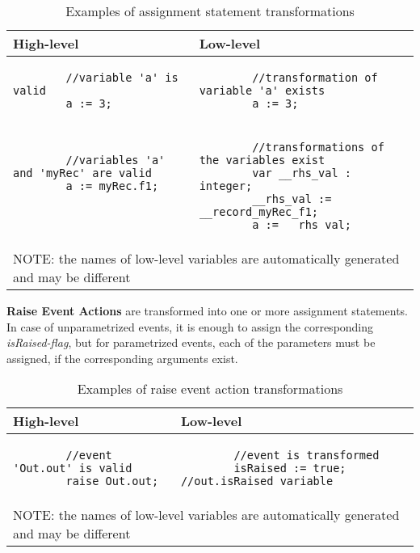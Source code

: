 \begin{table}[ht]
	\footnotesize
	\centering
	\begin{tabular}{ p{7cm} p{7cm} }
		\toprule
		High-level & Low-level \\
		\midrule
		\begin{lstlisting}
		//variable 'a' is valid
		a := 3;\end{lstlisting} & 
		\begin{lstlisting}
		//transformation of variable 'a' exists
		a := 3;\end{lstlisting} \\
		\begin{lstlisting}
		//variables 'a' and 'myRec' are valid
		a := myRec.f1;
		
		
		\end{lstlisting} & 
		\begin{lstlisting}
		//transformations of the variables exist
		var __rhs_val : integer;
		__rhs_val := __record_myRec_f1;
		a := __rhs_val;
		\end{lstlisting} \\
		\bottomrule
		\multicolumn{2}{l}{NOTE: the names of low-level variables are automatically generated and may be different}
	\end{tabular}
	\caption{Examples of assignment statement transformations}
	\label{tab:SCLLAssignmentStatementExample}
\end{table}

\bigskip
\textbf{Raise Event Actions} are transformed into one or more assignment statements. In case of unparametrized events, it is enough to assign the corresponding \textit{isRaised-flag}, but for parametrized events, each of the parameters must be assigned, if the corresponding arguments exist.

\begin{table}[ht]
	\footnotesize
	\centering
	\begin{tabular}{ p{7cm} p{7cm} }
		\toprule
		High-level & Low-level \\
		\midrule
		\begin{lstlisting}
		//event 'Out.out' is valid
		raise Out.out;\end{lstlisting} & 
		\begin{lstlisting}
		//event is transformed
		isRaised := true; //out.isRaised variable\end{lstlisting} \\
		\bottomrule
		\multicolumn{2}{l}{NOTE: the names of low-level variables are automatically generated and may be different}
	\end{tabular}
	\caption{Examples of raise event action transformations}
	\label{tab:SCLLRaiseEventActionExample}
\end{table}

